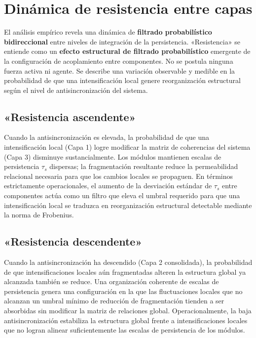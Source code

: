 \section{Dinámica de resistencia entre capas}

El análisis empírico revela una dinámica de \textbf{filtrado probabilístico bidireccional} entre niveles de integración de la persistencia. «Resistencia» se entiende como un \textbf{efecto estructural de filtrado probabilístico} emergente de la configuración de acoplamiento entre componentes. No se postula ninguna fuerza activa ni agente. Se describe una variación observable y medible en la probabilidad de que una intensificación local genere reorganización estructural según el nivel de antisincronización del sistema.

\subsection{«Resistencia ascendente»}

Cuando la antisincronización es elevada, la probabilidad de que una intensificación local (Capa 1) logre modificar la matriz de coherencias del sistema (Capa 3) disminuye sustancialmente. Los módulos mantienen escalas de persistencia $\tau_s$ dispersas; la fragmentación resultante reduce la permeabilidad relacional necesaria para que los cambios locales se propaguen. En términos estrictamente operacionales, el aumento de la desviación estándar de $\tau_s$ entre componentes actúa como un filtro que eleva el umbral requerido para que una intensificación local se traduzca en reorganización estructural detectable mediante la norma de Frobenius.

\subsection{«Resistencia descendente»}

Cuando la antisincronización ha descendido (Capa 2 consolidada), la probabilidad de que intensificaciones locales aún fragmentadas alteren la estructura global ya alcanzada también se reduce. Una organización coherente de escalas de persistencia genera una configuración en la que las fluctuaciones locales que no alcanzan un umbral mínimo de reducción de fragmentación tienden a ser absorbidas sin modificar la matriz de relaciones global. Operacionalmente, la baja antisincronización estabiliza la estructura global frente a intensificaciones locales que no logran alinear suficientemente las escalas de persistencia de los módulos.

